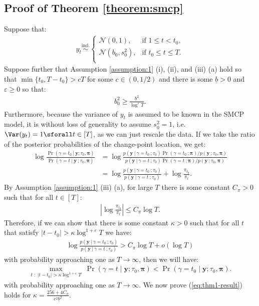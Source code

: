 \subsection{Proof of Theorem \ref{theorem:smcp}}
\label{app:localization-smcp}

Suppose that:
\begin{align*}
    y_t \overset{\text{ind.}}{\sim}
    \begin{cases}
        \mathcal{N}(0,1), &\text{if } 1 \leq t < t_0, \\
        \mathcal{N}(b_0,s_0^2), &\text{if } t_0 \leq t \leq T. \\
    \end{cases}
\end{align*}
Suppose further that Assumption \ref{assumption:1} (i), (ii), and (iii) (a) hold so that $\min\{t_0, T-t_0\} > cT$ for some $c \in (0,1/2)$ and there is some $\underline{b} > 0$ and $\varepsilon \geq 0$ so that:
\begin{align}\label{eq:thm1-b_0-bd}
    b^2_0 \geq \frac{\underline{b}^2}{\log^{\varepsilon} T}.
\end{align}
Furthermore, because the variance of $y_t$ is assumed to be known in the SMCP model, it is without loss of generality to assume $s_0^2 = 1$, i.e. $\Var(y_t) = 1 \sforall t \in [T]$, as we can just rescale the data. If we take the ratio of the posterior probabilities of the change-point location, we get:
\begin{align*}
    \log \frac{\Pr(\gamma = t_0  \:|\: \mathbf{y} ; \tau_0,\pmb{\pi})}{\Pr(\gamma = t  \:|\: \mathbf{y} \:; \tau_0,\pmb{\pi})} &=  \log \frac{p(\mathbf{y} \:|\:\gamma = t_0 \:; \tau_0)\Pr(\gamma = t_0 \:; \pmb{\pi})/ p(\mathbf{y}\:;\tau_0,\pmb{\pi})}{p(\mathbf{y} \:|\:\gamma = t \:; \tau_0)\Pr(\gamma = t \:;\pmb{\pi})/ p(\mathbf{y}\:;\tau_0,\pmb{\pi})} \tag{Bayes' rule} \\
    &= \log \frac{p(\mathbf{y} \:|\:\gamma = t_0 \:; \tau_0)}{p(\mathbf{y} \:|\:\gamma = t \:; \tau_0)} + \log \frac{\pi_{t_0}}{\pi_t}.
\end{align*}
By Assumption \ref{assumption:1} (iii) (a), for large $T$ there is some constant $C_\pi > 0$ such that for all $t \in [T]$: 
\begin{align}\label{eq:thm1-prior-bd}
    \left|\log \frac{\pi_{t_0}}{\pi_t}\right| \leq C_\pi \log T.
\end{align}
Therefore, if we can show that there is some constant $\kappa > 0$ such that for all $t$ that satisfy $|t - t_0| > \kappa\log^{1+\varepsilon} T$ we have:
\begin{align}
    \log \frac{p(\mathbf{y} \:|\:\gamma = t_0 \:; \tau_0)}{p(\mathbf{y} \:|\:\gamma = t \:; \tau_0)} > C_\pi \log T + o(\log T) \label{eq:thm1-result}
\end{align}
with probability approaching one as $T \to \infty$, then we will have:
\begin{align*}
    \max_{t \;:\; |t - t_0| > \kappa \log^{1+\varepsilon} T} \; \Pr(\gamma = t  \;|\; \mathbf{y} ; \tau_0,\pmb{\pi}) < \Pr(\gamma = t_0  \;|\; \mathbf{y} ; \tau_0,\pmb{\pi}).
\end{align*}
with probability approaching one as $T \to \infty$. We now prove (\ref{eq:thm1-result}) holds for $\kappa = \frac{256 + 4C_\pi}{c^2\underline{b}^2}$.

